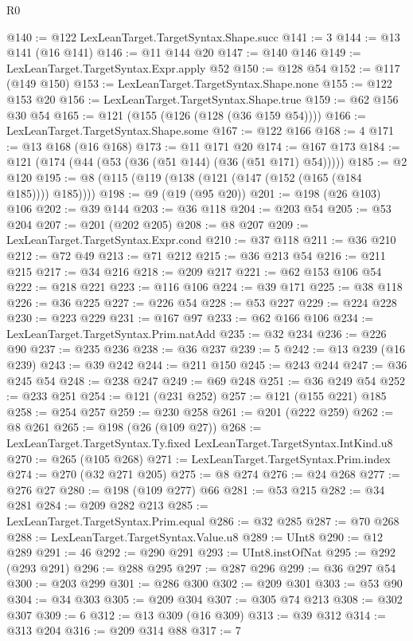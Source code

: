 \begin{lexlean}{R0}
\begin{coremodule}
@140 := @122 LexLeanTarget.TargetSyntax.Shape.succ
@141 := 3
@144 := @13 @141 (@16 @141)
@146 := @11 @144 @20
@147 := @140 @146
@149 := LexLeanTarget.TargetSyntax.Expr.apply @52
@150 := @128 @54
@152 := @117 (@149 @150)
@153 := LexLeanTarget.TargetSyntax.Shape.none
@155 := @122 @153 @20
@156 := LexLeanTarget.TargetSyntax.Shape.true
@159 := @62 @156 @30 @54
@165 := @121 (@155 (@126 (@128 (@36 @159 @54))))
@166 := LexLeanTarget.TargetSyntax.Shape.some
@167 := @122 @166
@168 := 4
@171 := @13 @168 (@16 @168)
@173 := @11 @171 @20
@174 := @167 @173
@184 := @121 (@174 (@44 (@53 (@36 (@51 @144) (@36 (@51 @171) @54)))))
@185 := @2 @120
@195 := @8 (@115 (@119 (@138 (@121 (@147 (@152 (@165 (@184 @185)))) @185))))
@198 := @9 (@19 (@95 @20))
@201 := @198 (@26 @103) @106
@202 := @39 @144
@203 := @36 @118
@204 := @203 @54
@205 := @53 @204
@207 := @201 (@202 @205)
@208 := @8 @207
@209 := LexLeanTarget.TargetSyntax.Expr.cond
@210 := @37 @118
@211 := @36 @210
@212 := @72 @49
@213 := @71 @212
@215 := @36 @213 @54
@216 := @211 @215
@217 := @34 @216
@218 := @209 @217
@221 := @62 @153 @106 @54
@222 := @218 @221
@223 := @116 @106
@224 := @39 @171
@225 := @38 @118
@226 := @36 @225
@227 := @226 @54
@228 := @53 @227
@229 := @224 @228
@230 := @223 @229
@231 := @167 @97
@233 := @62 @166 @106
@234 := LexLeanTarget.TargetSyntax.Prim.natAdd
@235 := @32 @234
@236 := @226 @90
@237 := @235 @236
@238 := @36 @237
@239 := 5
@242 := @13 @239 (@16 @239)
@243 := @39 @242
@244 := @211 @150
@245 := @243 @244
@247 := @36 @245 @54
@248 := @238 @247
@249 := @69 @248
@251 := @36 @249 @54
@252 := @233 @251
@254 := @121 (@231 @252)
@257 := @121 (@155 @221) @185
@258 := @254 @257
@259 := @230 @258
@261 := @201 (@222 @259)
@262 := @8 @261
@265 := @198 (@26 (@109 @27))
@268 := LexLeanTarget.TargetSyntax.Ty.fixed LexLeanTarget.TargetSyntax.IntKind.u8
@270 := @265 (@105 @268)
@271 := LexLeanTarget.TargetSyntax.Prim.index
@274 := @270 (@32 @271 @205)
@275 := @8 @274
@276 := @24 @268
@277 := @276 @27
@280 := @198 (@109 @277) @66
@281 := @53 @215
@282 := @34 @281
@284 := @209 @282 @213
@285 := LexLeanTarget.TargetSyntax.Prim.equal
@286 := @32 @285
@287 := @70 @268
@288 := LexLeanTarget.TargetSyntax.Value.u8
@289 := UInt8
@290 := @12 @289
@291 := 46
@292 := @290 @291
@293 := UInt8.instOfNat
@295 := @292 (@293 @291)
@296 := @288 @295
@297 := @287 @296
@299 := @36 @297 @54
@300 := @203 @299
@301 := @286 @300
@302 := @209 @301
@303 := @53 @90
@304 := @34 @303
@305 := @209 @304
@307 := @305 @74 @213
@308 := @302 @307
@309 := 6
@312 := @13 @309 (@16 @309)
@313 := @39 @312
@314 := @313 @204
@316 := @209 @314 @88
@317 := 7

\end{coremodule}
\end{lexlean}
